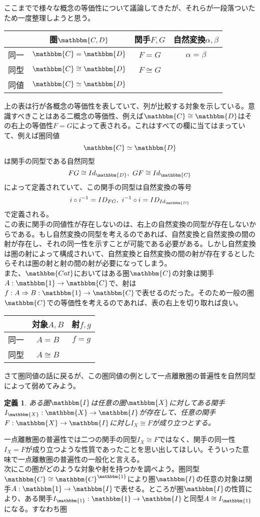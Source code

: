 \documentclass[uplatex,dvipdfmx]{jsarticle}
\newcommand{\cat}[1]{\mathbbm{#1}}
\newcommand{\arrow}{\rightarrow}
\newcommand{\functor}[3]{#1:\cat{#2}\arrow \cat{#3}}
\newcommand{\natf}[5]{#1:#2\Rightarrow #3:\cat{#4}\arrow \cat{#5}}
\newcommand{\funccat}[2]{\cat{#2}^\cat{#1}}
\newtheorem{define}[proof]{定義}
\numberwithin{proof}{subsection}
\begin{document}
  ここまでで様々な概念の等価性について議論してきたが、それらが一段落ついたため一度整理しようと思う。
  \begin{table}[htb]
    \centering
      \begin{tabular}{|c||c|c|c|}  \hline
      &圏$\cat{C,D}$&関手$F,G$&自然変換$\alpha,\beta$\\ \hline \hline
      同一&$\cat{C}=\cat{D}$&$F=G$&$\alpha=\beta$\\ \hline
      同型&$\cat{C}\cong\cat{D}$&$F\cong G$&\\ \hline
      同値&$\cat{C}\simeq\cat{D}$&&\\ \hline
    \end{tabular}
  \end{table}
  上の表は行が各概念の等価性を表していて、列が比較する対象を示している。意識すべきことはある二概念の等価性、例えば$\cat{C}\cong \cat{D}$はその右上の等価性$F=G$によって表される。これはすべての欄に当てはまっていて、例えば圏同値\[\cat{C}\simeq\cat{D}\]は関手の同型である自然同型\[FG\cong Id_\cat{D},\ GF\cong Id_\cat{C}\]によって定義されていて、この関手の同型は自然変換の等号\[i\circ i^{-1}=ID_{FG},\ i^{-1}\circ i=ID_{Id_\cat{D}}\]で定義される。\\
  この表に関手の同値性が存在しないのは、右上の自然変換の同型が存在しないからである。もし自然変換の同型を考えるのであれば、自然変換と自然変換の間の射が存在し、それの同一性を示すことが可能である必要がある。しかし自然変換は圏の射によって構成されいて、自然変換と自然変換の間の射が存在するとしたらそれは圏の射と射の間の射が必要になってしまう。\\
  また、$\cat{Cat}$においてはある圏$\cat{C}$の対象は関手$\functor{A}{1}{C}$で、射は$\natf{f}{A}{B}{1}{C}$で表せるのだった。そのため一般の圏$\cat{C}$での等価性を考えるのであれば、表の右上を切り取れば良い。
  \begin{table}[htb]
    \centering
      \begin{tabular}{|c||c|c|}  \hline
      &対象$A,B$&射$f,g$\\ \hline \hline
      同一&$A=B$&$f=g$\\ \hline
      同型&$A\cong B$&\\ \hline
    \end{tabular}
  \end{table}

  さて圏同値の話に戻るが、この圏同値の例として一点離散圏の普遍性を自然同型によって弱めてみよう。
  \begin{define}
    ある圏$\cat{I}$は任意の圏$\cat{X}$に対してある関手$\functor{I_\cat{X}}{X}{I}$が存在して、任意の関手$\functor{F}{X}{I}$に対し$I_X\cong F$が成り立つとする。
  \end{define}
  一点離散圏の普遍性では二つの関手の同型$I_X\cong F$ではなく、関手の同一性$I_X=F$が成り立つような性質であったことを思い出してほしい。そういった意味で一点離散圏の普遍性の一般化と言える。\\
  次にこの圏がどのような対象や射を持つかを調べよう。圏同型$\cat{C}\cong\funccat{1}{C}$により圏$\cat{I}$の任意の対象は関手$\functor{A}{1}{I}$で表せる。ところが圏$\cat{I}$の性質により、ある関手$\functor{I_\cat{1}}{1}{I}$と同型$A\cong I_\cat{1}$になる。すなわち圏
\end{document}
